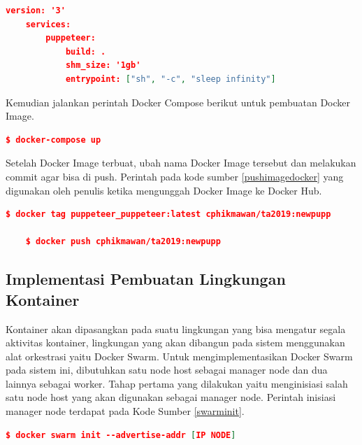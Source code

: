 				\begin{lstlisting}[frame=single,tabsize=2,breaklines,caption={Konfigurasi docker-compose.yml },label=dockercompose, captionpos=b, language=json]
	version: '3'
	services:
		puppeteer:
			build: .
			shm_size: '1gb'
			entrypoint: ["sh", "-c", "sleep infinity"]
				\end{lstlisting}
				
				Kemudian jalankan perintah Docker Compose berikut untuk pembuatan Docker Image.
				\begin{lstlisting}[frame=single,tabsize=2,breaklines,caption={Perintah untuk menjalankan  Docker Compose},label=createimg, captionpos=b, language=json,numbers=none]
	$ docker-compose up
				\end{lstlisting}
				
				Setelah Docker Image terbuat, ubah nama Docker Image tersebut dan melakukan commit agar bisa di push. Perintah pada kode sumber \ref{pushimagedocker} yang digunakan oleh penulis ketika mengunggah Docker Image ke Docker Hub.
				\begin{lstlisting}[frame=single,tabsize=2,breaklines,caption={Perintah untuk mengunggah Docker Image},label=pushimagedocker, captionpos=b, language=json,numbers=none]
	$ docker tag puppeteer_puppeteer:latest cphikmawan/ta2019:newpupp
	
	$ docker push cphikmawan/ta2019:newpupp
				\end{lstlisting}
				
		\subsection{Implementasi Pembuatan Lingkungan Kontainer}
			Kontainer akan dipasangkan pada suatu lingkungan yang bisa mengatur segala aktivitas kontainer, lingkungan yang akan dibangun pada sistem menggunakan alat orkestrasi yaitu Docker Swarm. Untuk mengimplementasikan Docker Swarm pada sistem ini, dibutuhkan satu node host sebagai manager node dan dua lainnya sebagai worker. Tahap pertama yang dilakukan yaitu menginisiasi salah satu node host yang akan digunakan sebagai manager node. Perintah inisiasi manager node terdapat pada Kode Sumber \ref{swarminit}. \\
			\begin{lstlisting}[frame=single,tabsize=2,breaklines,caption={Perintah untuk inisiasi manager node},label=swarminit, captionpos=b, language=json,numbers=none]
	$ docker swarm init --advertise-addr [IP NODE]
			\end{lstlisting}
			
